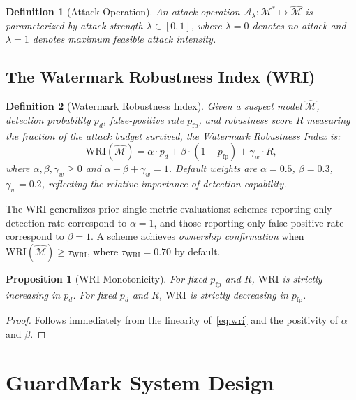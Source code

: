 \documentclass[journal,compsoc]{IEEEtran}
\newtheorem{definition}{Definition}
\newtheorem{proposition}{Proposition}
\newcommand{\M}{\mathcal{M}}
\newcommand{\WRI}{\mathrm{WRI}}
\begin{document}
\begin{definition}[Attack Operation]
An attack operation $\mathcal{A}_\lambda: \M^* \mapsto \hat{\M}$ is
parameterized by attack strength $\lambda \in [0,1]$, where $\lambda=0$
denotes no attack and $\lambda=1$ denotes maximum feasible attack intensity.
\end{definition}

\subsection{The Watermark Robustness Index (WRI)}

\begin{definition}[Watermark Robustness Index]
\label{def:wri}
Given a suspect model $\hat{\M}$, detection probability $p_d$, false-positive
rate $p_{\text{fp}}$, and robustness score $R$ measuring the fraction of the
attack budget survived, the \emph{Watermark Robustness Index} is:
\begin{equation}
  \WRI(\hat{\M}) = \alpha \cdot p_d + \beta \cdot (1 - p_{\text{fp}})
    + \gamma_w \cdot R,
  \label{eq:wri}
\end{equation}
where $\alpha, \beta, \gamma_w \geq 0$ and $\alpha + \beta + \gamma_w = 1$.
Default weights are $\alpha = 0.5$, $\beta = 0.3$, $\gamma_w = 0.2$,
reflecting the relative importance of detection capability.
\end{definition}

The WRI generalizes prior single-metric evaluations: schemes reporting only
detection rate correspond to $\alpha=1$, and those reporting only
false-positive rate correspond to $\beta=1$. A scheme achieves \emph{ownership
confirmation} when $\WRI(\hat{\M}) \geq \tau_{\WRI}$, where
$\tau_{\WRI} = 0.70$ by default.

\begin{proposition}[WRI Monotonicity]
For fixed $p_{\text{fp}}$ and $R$, $\WRI$ is strictly increasing in $p_d$.
For fixed $p_d$ and $R$, $\WRI$ is strictly decreasing in $p_{\text{fp}}$.
\end{proposition}
\begin{proof}
Follows immediately from the linearity of~\eqref{eq:wri} and the positivity
of $\alpha$ and $\beta$.
\end{proof}

\section{GuardMark System Design}
\label{sec:system}
\end{document}
